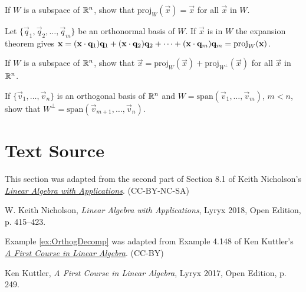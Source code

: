 \documentclass{ximera}
\begin{document}
\begin{problem}\label{prob:8_1_10}
If $W$ is a subspace of $\mathbb{R}^n$, show that $\mbox{proj}_W(\vec{x}) = \vec{x}$ for all $\vec{x}$ in $W$.

\begin{hint}
Let $\{\vec{q}_{1}, \vec{q}_{2}, \dots , \vec{q}_{m}\}$ be an orthonormal basis of $W$. If $\vec{x}$ is in $W$ the expansion theorem gives $\mathbf{x} = (\mathbf{x} \cdot \mathbf{q}_{1})\mathbf{q}_{1} + (\mathbf{x} \cdot \mathbf{q}_{2})\mathbf{q}_{2} + \dots  + (\mathbf{x} \cdot \mathbf{q}_{m})\mathbf{q}_{m} = \mbox{proj}_W(\mathbf{x})$.
\end{hint}
\end{problem}

\begin{problem}\label{prob:8_1_11}
If $W$ is a subspace of $\mathbb{R}^n$, show that $\vec{x} = \mbox{proj}_W(\vec{x}) + \mbox{proj}_{W^\perp}(\vec{x})$ for all $\vec{x}$ in $\mathbb{R}^n$.
\end{problem}

\begin{problem}\label{prob:8_1_12}
If $\{\vec{v}_{1}, \dots, \vec{v}_{n}\}$ is an orthogonal basis of $\mathbb{R}^n$ and $W = \mbox{span}\left(\vec{v}_{1}, \dots, \vec{v}_{m}\right)$, $m<n$, show that $W^\perp = \mbox{span}\left(\vec{v}_{m + 1}, \dots, \vec{v}_{n}\right)$.
\end{problem}


\section*{Text Source} This section was adapted from the second part of Section 8.1 of Keith Nicholson's \href{https://open.umn.edu/opentextbooks/textbooks/linear-algebra-with-applications}{\it Linear Algebra with Applications}. (CC-BY-NC-SA)

W. Keith Nicholson, {\it Linear Algebra with Applications}, Lyryx 2018, Open Edition, p. 415--423. 

Example \ref{ex:OrthogDecomp}  was adapted from Example 4.148  of Ken Kuttler's \href{https://open.umn.edu/opentextbooks/textbooks/a-first-course-in-linear-algebra-2017}{\it A First Course in Linear Algebra}. (CC-BY)

Ken Kuttler, {\it  A First Course in Linear Algebra}, Lyryx 2017, Open Edition, p. 249. 



\end{document}
